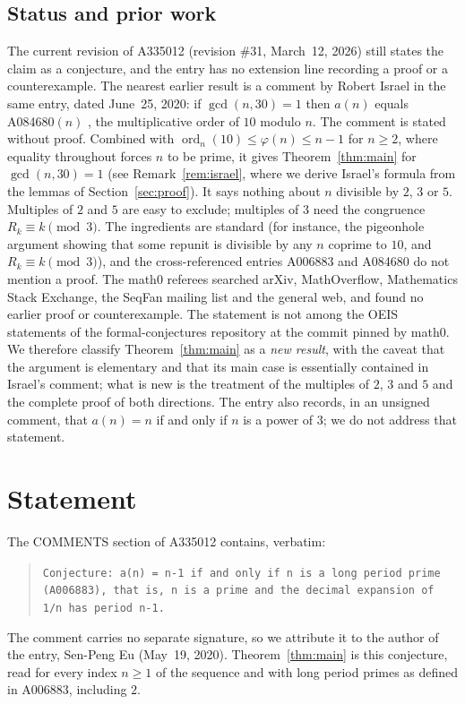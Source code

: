 \documentclass[11pt]{amsart}
\theoremstyle{plain}
\theoremstyle{definition}
\DeclareMathOperator{\ord}{ord}
\begin{document}
\subsection*{Status and prior work}
The current revision of A335012 (revision \#31, March~12, 2026) still states the claim as a conjecture, and the entry has no extension line recording a proof or a counterexample.
The nearest earlier result is a comment by Robert Israel in the same entry, dated June~25, 2020: if $\gcd(n,30)=1$ then $a(n)$ equals A084680$(n)$ \cite{A084680}, the multiplicative order of $10$ modulo $n$.
The comment is stated without proof.
Combined with $\ord_n(10)\le\varphi(n)\le n-1$ for $n\ge2$, where equality throughout forces $n$ to be prime, it gives Theorem~\ref{thm:main} for $\gcd(n,30)=1$ (see Remark~\ref{rem:israel}, where we derive Israel's formula from the lemmas of Section~\ref{sec:proof}).
It says nothing about $n$ divisible by $2$, $3$ or $5$.
Multiples of $2$ and $5$ are easy to exclude; multiples of $3$ need the congruence $R_k\equiv k\pmod 3$.
The ingredients are standard (for instance, the pigeonhole argument showing that some repunit is divisible by any $n$ coprime to $10$, and $R_k\equiv k\pmod 3$), and the cross-referenced entries A006883 and A084680 do not mention a proof.
The math0 referees searched arXiv, MathOverflow, Mathematics Stack Exchange, the SeqFan mailing list and the general web, and found no earlier proof or counterexample.
The statement is not among the OEIS statements of the formal-conjectures repository \cite{FC} at the commit pinned by math0.
We therefore classify Theorem~\ref{thm:main} as a \emph{new result}, with the caveat that the argument is elementary and that its main case is essentially contained in Israel's comment; what is new is the treatment of the multiples of $2$, $3$ and $5$ and the complete proof of both directions.
The entry also records, in an unsigned comment, that $a(n)=n$ if and only if $n$ is a power of $3$; we do not address that statement.

\section{Statement}\label{sec:statement}

The COMMENTS section of A335012 \cite{A335012} contains, verbatim:
\begin{quote}\raggedright
{\small\texttt{Conjecture: a(n) = n-1 if and only if n is a long period prime (A006883), that is, n is a prime and the decimal expansion of 1/n has period n-1.}}
\end{quote}
The comment carries no separate signature, so we attribute it to the author of the entry, Sen-Peng Eu (May~19, 2020).
Theorem~\ref{thm:main} is this conjecture, read for every index $n\ge1$ of the sequence and with long period primes as defined in A006883, including $2$.
\end{document}
